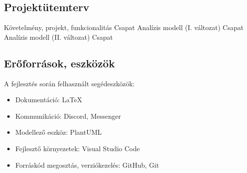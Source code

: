 \subsection{Projektütemterv}
\begin{terv}
		  {Követelmény, projekt, funkcionalitás}{ Csapat }
         { Analízis modell (I. változat) }{ Csapat } 
         { Analízis modell (II. változat) }{ Csapat }
\end{terv}

\subsection{Erőforrások, eszközök}
A fejlesztés során felhasznált segédeszközök:
\begin{itemize}
	\item Dokumentáció: LaTeX
	\item Kommunikáció: Discord, Messenger
	\item Modellező eszköz: PlantUML
	\item Fejlesztő környezetek: Visual Studio Code
	\item Forráskód megosztás, verziókezelés: GitHub, Git
\end{itemize}
